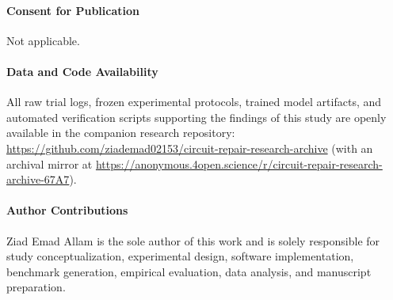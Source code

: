 \documentclass[11pt,a4paper]{article}
\begin{document}
\paragraph{Consent for Publication}
Not applicable.

\paragraph{Data and Code Availability}
All raw trial logs, frozen experimental protocols, trained model artifacts, and automated verification scripts supporting the findings of this study are openly available in the companion research repository: \url{https://github.com/ziademad02153/circuit-repair-research-archive} (with an archival mirror at \url{https://anonymous.4open.science/r/circuit-repair-research-archive-67A7}).

\paragraph{Author Contributions}
Ziad Emad Allam is the sole author of this work and is solely responsible for study conceptualization, experimental design, software implementation, benchmark generation, empirical evaluation, data analysis, and manuscript preparation.



\end{document}
